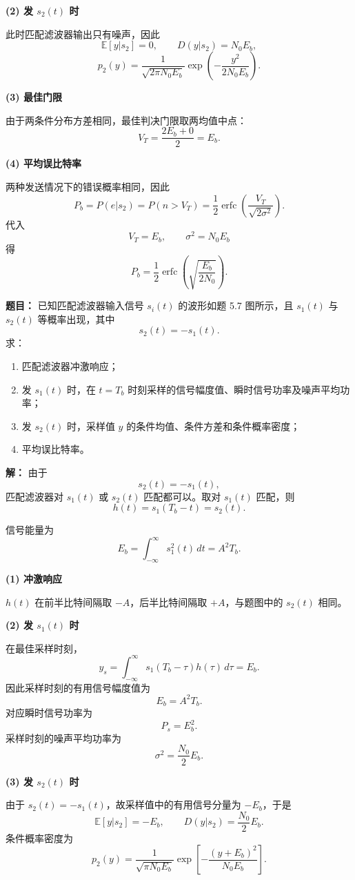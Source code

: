 \textbf{(2) 发 $s_2(t)$ 时}\par
此时匹配滤波器输出只有噪声，因此
\[
\mathbb{E}[y|s_2]=0,
\qquad
D(y|s_2)=N_0E_b,
\]
\[
p_2(y)=\frac{1}{\sqrt{2\pi N_0E_b}}
\exp\!\left(-\frac{y^2}{2N_0E_b}\right).
\]

\textbf{(3) 最佳门限}\par
由于两条件分布方差相同，最佳判决门限取两均值中点：
\[
V_T=\frac{2E_b+0}{2}=E_b.
\]

\textbf{(4) 平均误比特率}\par
两种发送情况下的错误概率相同，因此
\[
P_b=P(e|s_2)=P(n>V_T)
=\frac12\operatorname{erfc}\!\left(\frac{V_T}{\sqrt{2\sigma^2}}\right).
\]
代入
\[
V_T=E_b,\qquad \sigma^2=N_0E_b
\]
得
\[
P_b=\frac12\operatorname{erfc}\!\left(\sqrt{\frac{E_b}{2N_0}}\right).
\]

\medskip
{}
\textbf{题目：}
已知匹配滤波器输入信号 $s_i(t)$ 的波形如题 5.7 图所示，且 $s_1(t)$ 与 $s_2(t)$ 等概率出现，其中
\[
s_2(t)=-s_1(t).
\]
求：
\begin{enumerate}
\item 匹配滤波器冲激响应；
\item 发 $s_1(t)$ 时，在 $t=T_b$ 时刻采样的信号幅度值、瞬时信号功率及噪声平均功率；
\item 发 $s_2(t)$ 时，采样值 $y$ 的条件均值、条件方差和条件概率密度；
\item 平均误比特率。
\end{enumerate}

\par\textbf{解：}
由于
\[
s_2(t)=-s_1(t),
\]
匹配滤波器对 $s_1(t)$ 或 $s_2(t)$ 匹配都可以。取对 $s_1(t)$ 匹配，则
\[
h(t)=s_1(T_b-t)=s_2(t).
\]

信号能量为
\[
E_b=\int_{-\infty}^{\infty}s_1^2(t)\,dt=A^2T_b.
\]

\textbf{(1) 冲激响应}\par
$h(t)$ 在前半比特间隔取 $-A$，后半比特间隔取 $+A$，与题图中的 $s_2(t)$ 相同。

\textbf{(2) 发 $s_1(t)$ 时}\par
在最佳采样时刻，
\[
y_s=\int_{-\infty}^{\infty}s_1(T_b-\tau)h(\tau)\,d\tau=E_b.
\]
因此采样时刻的有用信号幅度值为
\[
E_b=A^2T_b.
\]
对应瞬时信号功率为
\[
P_s=E_b^2.
\]
采样时刻的噪声平均功率为
\[
\sigma^2=\frac{N_0}{2}E_b.
\]

\textbf{(3) 发 $s_2(t)$ 时}\par
由于 $s_2(t)=-s_1(t)$，故采样值中的有用信号分量为 $-E_b$，于是
\[
\mathbb{E}[y|s_2]=-E_b,
\qquad
D(y|s_2)=\frac{N_0}{2}E_b.
\]
条件概率密度为
\[
p_2(y)=\frac{1}{\sqrt{\pi N_0E_b}}
\exp\!\left[-\frac{(y+E_b)^2}{N_0E_b}\right].
\]

